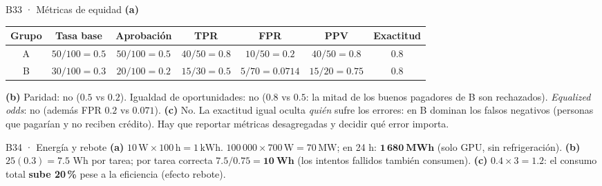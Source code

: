 \begin{solucion}{B33 · Métricas de equidad}
\textbf{(a)}
\begin{center}\small
\begin{tabular}{c|cccccc}
Grupo & Tasa base & Aprobación & TPR & FPR & PPV & Exactitud\\\hline
A & $50/100=0.5$ & $50/100=0.5$ & $40/50=0.8$ & $10/50=0.2$ & $40/50=0.8$ & 0.8\\
B & $30/100=0.3$ & $20/100=0.2$ & $15/30=0.5$ & $5/70=0.0714$ & $15/20=0.75$ & 0.8
\end{tabular}
\end{center}
\textbf{(b)} Paridad: no ($0.5$ vs $0.2$). Igualdad de oportunidades: no ($0.8$ vs $0.5$: la mitad de los buenos pagadores de B son rechazados).
\emph{Equalized odds}: no (además FPR $0.2$ vs $0.071$).
\textbf{(c)} No. La exactitud igual oculta \emph{quién} sufre los errores: en B dominan los falsos negativos (personas que pagarían y no reciben
crédito). Hay que reportar métricas desagregadas y decidir qué error importa.
\end{solucion}

\begin{solucion}{B34 · Energía y rebote}
\textbf{(a)} $10\,\mathrm W\times100\,\mathrm h=1\,\mathrm{kWh}$. $100\,000\times700\,\mathrm W=70\,\mathrm{MW}$; en 24 h: $\mathbf{1\,680\ MWh}$ (solo GPU, sin refrigeración).
\textbf{(b)} $25(0.3)=7.5$ Wh por tarea; por tarea correcta $7.5/0.75=\mathbf{10\ Wh}$ (los intentos fallidos también consumen).
\textbf{(c)} $0.4\times3=1.2$: el consumo total \textbf{sube 20\,\%} pese a la eficiencia (efecto rebote).
\end{solucion}
